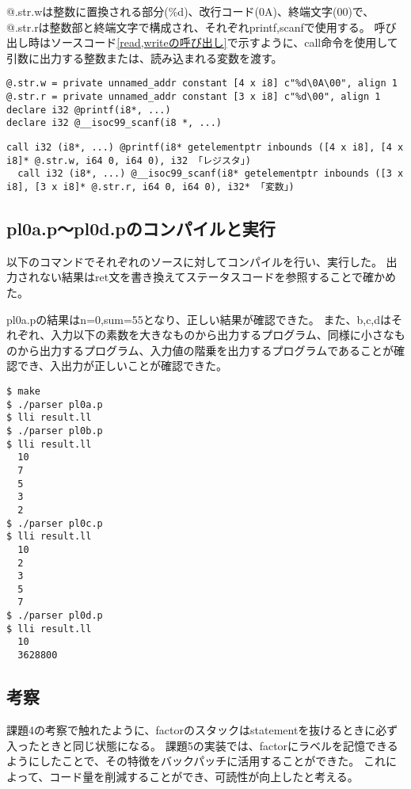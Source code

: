 @.str.wは整数に置換される部分(\%d)、改行コード(0A)、終端文字(00)で、@.str.rは整数部と終端文字で構成され、それぞれprintf,scanfで使用する。
呼び出し時はソースコード\ref{read,writeの呼び出し}で示すように、call命令を使用して引数に出力する整数または、読み込まれる変数を渡す。

\begin{lstlisting}[caption={read,writeのための宣言},label={read,writeのための宣言}]
@.str.w = private unnamed_addr constant [4 x i8] c"%d\0A\00", align 1
@.str.r = private unnamed_addr constant [3 x i8] c"%d\00", align 1
declare i32 @printf(i8*, ...)
declare i32 @__isoc99_scanf(i8 *, ...)
\end{lstlisting}

\begin{lstlisting}[caption={read,writeの呼び出し},label={read,writeの呼び出し}]
  call i32 (i8*, ...) @printf(i8* getelementptr inbounds ([4 x i8], [4 x i8]* @.str.w, i64 0, i64 0), i32 「レジスタ」)
  call i32 (i8*, ...) @__isoc99_scanf(i8* getelementptr inbounds ([3 x i8], [3 x i8]* @.str.r, i64 0, i64 0), i32* 「変数」)
\end{lstlisting}


\subsection{pl0a.p～pl0d.pのコンパイルと実行}
以下のコマンドでそれぞれのソースに対してコンパイルを行い、実行した。
出力されない結果はret文を書き換えてステータスコードを参照することで確かめた。

pl0a.pの結果はn=0,sum=55となり、正しい結果が確認できた。
また、b,c,dはそれぞれ、入力以下の素数を大きなものから出力するプログラム、同様に小さなものから出力するプログラム、入力値の階乗を出力するプログラムであることが確認でき、入出力が正しいことが確認できた。

\begin{lstlisting}[caption={pl0a.p～pl0d.pのコンパイルと実行コマンド},label={pl0a.p～pl0d.pのコンパイルと実行コマンド}]
$ make
$ ./parser pl0a.p
$ lli result.ll
$ ./parser pl0b.p
$ lli result.ll
  10
  7
  5
  3
  2
$ ./parser pl0c.p
$ lli result.ll
  10
  2
  3
  5
  7
$ ./parser pl0d.p
$ lli result.ll
  10
  3628800
\end{lstlisting}

\subsection{考察}
課題4の考察で触れたように、factorのスタックはstatementを抜けるときに必ず入ったときと同じ状態になる。
課題5の実装では、factorにラベルを記憶できるようにしたことで、その特徴をバックパッチに活用することができた。
これによって、コード量を削減することができ、可読性が向上したと考える。
